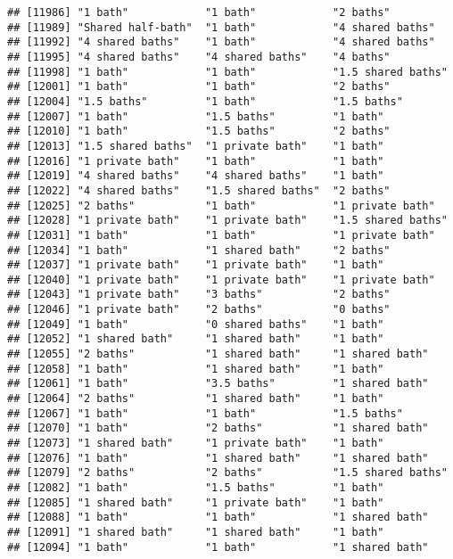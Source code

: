 \documentclass[
]{article}
\begin{document}
\begin{verbatim}
## [11986] "1 bath"            "1 bath"            "2 baths"          
## [11989] "Shared half-bath"  "1 bath"            "4 shared baths"   
## [11992] "4 shared baths"    "1 bath"            "4 shared baths"   
## [11995] "4 shared baths"    "4 shared baths"    "4 baths"          
## [11998] "1 bath"            "1 bath"            "1.5 shared baths" 
## [12001] "1 bath"            "1 bath"            "2 baths"          
## [12004] "1.5 baths"         "1 bath"            "1.5 baths"        
## [12007] "1 bath"            "1.5 baths"         "1 bath"           
## [12010] "1 bath"            "1.5 baths"         "2 baths"          
## [12013] "1.5 shared baths"  "1 private bath"    "1 bath"           
## [12016] "1 private bath"    "1 bath"            "1 bath"           
## [12019] "4 shared baths"    "4 shared baths"    "1 bath"           
## [12022] "4 shared baths"    "1.5 shared baths"  "2 baths"          
## [12025] "2 baths"           "1 bath"            "1 private bath"   
## [12028] "1 private bath"    "1 private bath"    "1.5 shared baths" 
## [12031] "1 bath"            "1 bath"            "1 private bath"   
## [12034] "1 bath"            "1 shared bath"     "2 baths"          
## [12037] "1 private bath"    "1 private bath"    "1 bath"           
## [12040] "1 private bath"    "1 private bath"    "1 private bath"   
## [12043] "1 private bath"    "3 baths"           "2 baths"          
## [12046] "1 private bath"    "2 baths"           "0 baths"          
## [12049] "1 bath"            "0 shared baths"    "1 bath"           
## [12052] "1 shared bath"     "1 shared bath"     "1 bath"           
## [12055] "2 baths"           "1 shared bath"     "1 shared bath"    
## [12058] "1 bath"            "1 shared bath"     "1 bath"           
## [12061] "1 bath"            "3.5 baths"         "1 shared bath"    
## [12064] "2 baths"           "1 shared bath"     "1 bath"           
## [12067] "1 bath"            "1 bath"            "1.5 baths"        
## [12070] "1 bath"            "2 baths"           "1 shared bath"    
## [12073] "1 shared bath"     "1 private bath"    "1 bath"           
## [12076] "1 bath"            "1 shared bath"     "1 shared bath"    
## [12079] "2 baths"           "2 baths"           "1.5 shared baths" 
## [12082] "1 bath"            "1.5 baths"         "1 bath"           
## [12085] "1 shared bath"     "1 private bath"    "1 bath"           
## [12088] "1 bath"            "1 bath"            "1 shared bath"    
## [12091] "1 shared bath"     "1 shared bath"     "1 bath"           
## [12094] "1 bath"            "1 bath"            "1 shared bath"    

\end{verbatim}
\end{document}
